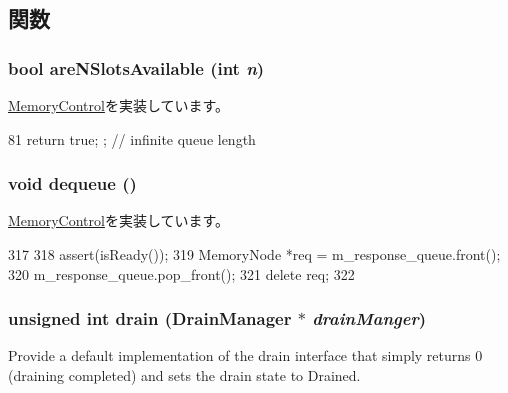 \subsection{関数}
\hypertarget{classRubyMemoryControl_a99a0d76f7266570912e6b0901cfaf9cf}{
\subsubsection[{areNSlotsAvailable}]{\setlength{\rightskip}{0pt plus 5cm}bool areNSlotsAvailable (int {\em n})}}
\label{classRubyMemoryControl_a99a0d76f7266570912e6b0901cfaf9cf}


\hyperlink{classMemoryControl_ad5bc408383076d5b274d5c3be9b42c89}{MemoryControl}を実装しています。


\begin{DoxyCode}
81 { return true; };  // infinite queue length
\end{DoxyCode}
\hypertarget{classRubyMemoryControl_a851b6644e3e336c07f8e6fe77234b97f}{
\subsubsection[{dequeue}]{\setlength{\rightskip}{0pt plus 5cm}void dequeue ()}}
\label{classRubyMemoryControl_a851b6644e3e336c07f8e6fe77234b97f}


\hyperlink{classMemoryControl_abc9fc85f4dd561e833bf6b34a78ebcb8}{MemoryControl}を実装しています。


\begin{DoxyCode}
317 {
318     assert(isReady());
319     MemoryNode *req = m_response_queue.front();
320     m_response_queue.pop_front();
321     delete req;
322 }
\end{DoxyCode}
\hypertarget{classRubyMemoryControl_aa8a18d230dba7a674ac8a0b4f35bc36a}{
\subsubsection[{drain}]{\setlength{\rightskip}{0pt plus 5cm}unsigned int drain ({\bf DrainManager} $\ast$ {\em drainManger})}}
\label{classRubyMemoryControl_aa8a18d230dba7a674ac8a0b4f35bc36a}
Provide a default implementation of the drain interface that simply returns 0 (draining completed) and sets the drain state to Drained. 

